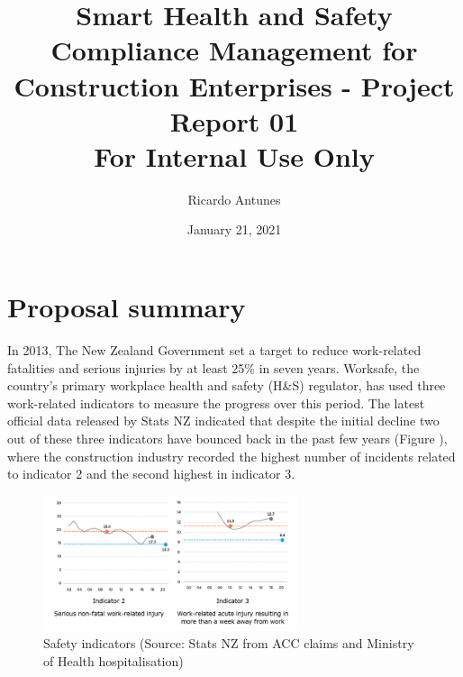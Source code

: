 \documentclass{article}
\author{Ricardo Antunes}
\date{January 21, 2021}
\title{Smart Health and Safety Compliance Management for Construction Enterprises - Project Report 01\\\medskip
\large For Internal Use Only}
\begin{document}
\maketitle
\tableofcontents



\section{Proposal summary}
\label{sec:org810df31}

In 2013, The New Zealand Government set a target to reduce work-related fatalities and serious injuries by at least 25\% in seven years. 
Worksafe, the country's primary workplace health and safety (H\&S) regulator, has used three work-related indicators to measure the progress over this period. 
The latest official data released by Stats NZ indicated that despite the initial decline two out of these three indicators have bounced back in the past few years (Figure \label{org2c82db5}), where the construction industry recorded the highest number of incidents related to indicator 2 and the second highest in indicator 3.  

\begin{figure}[htbp]
\centering
\includegraphics[height=150]{./Images/fig_01.png}
\caption{\label{fig:orgede4ea3}Safety indicators (Source: Stats NZ from ACC claims and Ministry of Health hospitalisation)}
\end{figure}
\end{document}

